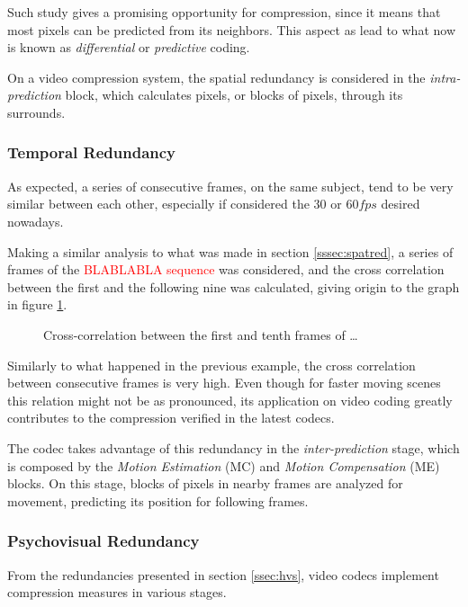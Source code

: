 Such study gives a promising opportunity for compression, since it means that most pixels can be predicted from its neighbors. This aspect as lead to what now is known as \emph{differential} or \emph{predictive} coding.

On a video compression system, the spatial redundancy is considered in the \emph{intra-prediction} block, which calculates pixels, or blocks of pixels, through its surrounds.

\subsubsection{Temporal Redundancy}

As expected, a series of consecutive frames, on the same subject, tend to be very similar between each other, especially if considered the $30$ or $60 fps$ desired nowadays. 

Making a similar analysis to what was made in section \ref{sssec:spatred}, a series of frames of the \textcolor{red}{BLABLABLA sequence} was considered, and the cross correlation between the first and the following nine was calculated, giving origin to the graph in figure \ref{fig:crosscorr}.

\begin{figure}[h]
    \centering
    \caption{Cross-correlation between the first and tenth frames of \dots}
    \label{fig:crosscorr}
\end{figure}

Similarly to what happened in the previous example, the cross correlation between consecutive frames is very high. Even though for faster moving scenes this relation might not be as pronounced, its application on video coding greatly contributes to the compression verified in the latest codecs. 

The codec takes advantage of this redundancy in the \emph{inter-prediction} stage, which is composed by the \emph{Motion Estimation} (MC) and \emph{Motion Compensation} (ME) blocks. On this stage, blocks of pixels in nearby frames are analyzed for movement, predicting its position for following frames.

\subsubsection{Psychovisual Redundancy}

From the redundancies presented in section \ref{ssec:hvs}, video codecs implement compression measures in various stages.

